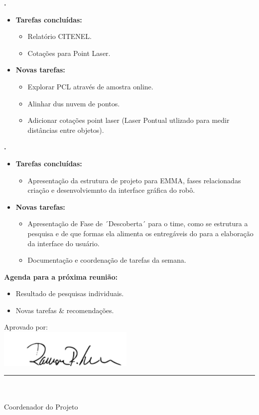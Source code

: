 	
	  \textbf{\elael.} 
	\begin{itemize}
		\item \textbf{Tarefas concluídas:}
			\begin{itemize}    
				\item Relatório CITENEL.
				\item Cotações para Point Laser. 
			\end{itemize}
		
		\item \textbf{Novas tarefas:}
			\begin{itemize} 
			    \item Explorar PCL através de amostra online.
			    \item Alinhar dus nuvem de pontos.
			    \item Adicionar cotações point laser (Laser Pontual utlizado para medir
			    distâncias entre objetos).
			\end{itemize}
	\end{itemize}			
			
			
   \textbf{\julia.} 
	\begin{itemize}
		\item \textbf{Tarefas concluídas:}
			\begin{itemize}    
				\item Apresentação da estrutura de projeto para EMMA, fases relacionadas
				criação e desenvolviemnto da interface gráfica do robô.
			\end{itemize}
		
		\item \textbf{Novas tarefas:}
			\begin{itemize} 
			    \item Apresentação de Fase de ´Descoberta´ para o time, como se
			    estrutura a pesquisa e de que formas ela alimenta os entregáveis do
			   para a elaboração da interface do usuário. 
			    \item Documentação e coordenação de tarefas da semana.
			\end{itemize}
	\end{itemize}		



\textbf{Agenda para a próxima reunião:}
  \begin{itemize}
    \item Resultado de pesquisas individuais.
    \item Novas tarefas \& recomendações.
  \end{itemize}


\vspace{5mm}%
\parbox[t]{70mm}{
  Aprovado por: \\[5mm]
  \centering
  \includegraphics[width=65mm]{figs/logo/assinatura-ramon.png} \\[-4mm]
  \rule[2mm]{70mm}{0.1mm} \\
  \ramon \\[1mm]
  Coordenador do Projeto \\
}

\fim
